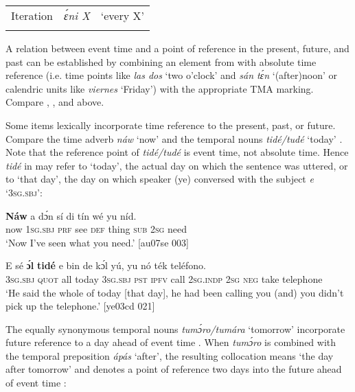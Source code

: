 \begin{table}
\begin{tabularx}{\textwidth}{lXX}
\tablevspace
Iteration & \itshape ɛ́ni X & ‘every X’\\
\lspbottomrule
\end{tabularx}
\end{table}
A relation between event time and a point of reference in the present, future, and past can be established by combining an element from  with absolute time reference (i.e. time points like \textit{las dos} ‘two o’clock’ and \textit{sán tɛ́n} ‘(after)noon’ or calendric units like \textit{viernes} ‘Friday’) with the appropriate TMA marking. Compare , , and  above. 


Some items lexically incorporate time reference to the present, past, or future. Compare the time adverb \textit{náw} ‘now’  and the temporal nouns \textit{tidé/tudé} ‘today’ . Note that the reference point of \textit{tidé/tudé} is event time, not absolute time. Hence \textit{tidé} in  may refer to ‘today’, the actual day on which the sentence was uttered, or to ‘that day’, the day on which speaker (ye) conversed with the subject \textit{e} ‘\textsc{3sg.sbj}’:



\ea%
    \label{ex:key:1008}
    \gll \textbf{Náw}    a    dɔ́n  sí  di  tín    wé  yu  níd.\\
now    \textsc{1sg.sbj}  \textsc{prf}  see  \textsc{def}  thing  \textsc{sub}  \textsc{2sg}  need\\

\glt ‘Now I’ve seen what you need.’ [au07se 003]
\z


\ea%
    \label{ex:key:1009}
    \gll E    sé    \textbf{ɔ́l}  \textbf{tidé}    e    bin  de  kɔ́l  yú,
yu  nó  ték    teléfono.\\
\textsc{3sg.sbj}  \textsc{quot}    all  today  \textsc{3sg.sbj}  \textsc{pst}  \textsc{ipfv}  call  \textsc{2sg.indp}
\textsc{2sg}  \textsc{neg} take    telephone\\

\glt ‘He said the whole of today [that day], he had been calling you (and) you didn’t 
pick up the telephone.’ [ye03cd 021]
\z

The equally synonymous temporal nouns \textit{tumɔ́ro/tumára} ‘tomorrow’ incorporate future reference to a day ahead of event time . When \textit{tumɔ́ro} is combined with the temporal preposition \textit{ápás} ‘after’, the resulting collocation means ‘the day after tomorrow’ and denotes a point of reference two days into the future ahead of event time :


